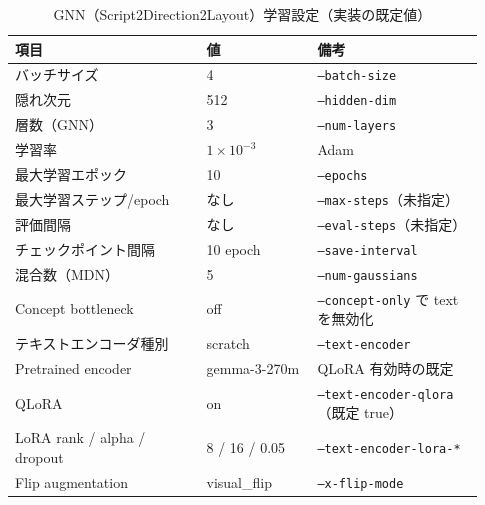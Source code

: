 \documentclass[a4j,12pt,dvipdfmx]{jsreport}
\begin{document}
\begin{table}[htbp]
  \centering
  \small
  \begin{threeparttable}
    \caption{GNN（Script2Direction2Layout）学習設定（実装の既定値）}
    \label{tab:gnn_hparams}
    \begin{tabular}{p{0.38\linewidth} p{0.22\linewidth} p{0.33\linewidth}}
      \toprule
      \textbf{項目}                 & \textbf{値}       & \textbf{備考}                            \\
      \midrule
      バッチサイズ                      & 4                & \texttt{--batch-size}                  \\
      隠れ次元                        & 512              & \texttt{--hidden-dim}                  \\
      層数（GNN）                     & 3                & \texttt{--num-layers}                  \\
      学習率                         & $1\times10^{-3}$ & Adam                                   \\
      最大学習エポック                    & 10               & \texttt{--epochs}                      \\
      最大学習ステップ/epoch              & なし               & \texttt{--max-steps}（未指定）              \\
      評価間隔                        & なし               & \texttt{--eval-steps}（未指定）             \\
      チェックポイント間隔                  & 10 epoch         & \texttt{--save-interval}               \\
      混合数（MDN）                    & 5                & \texttt{--num-gaussians}               \\
      Concept bottleneck          & off              & \texttt{--concept-only} で text を無効化    \\
      テキストエンコーダ種別                 & scratch          & \texttt{--text-encoder}                \\
      Pretrained encoder          & gemma-3-270m     & QLoRA 有効時の既定                           \\
      QLoRA                       & on               & \texttt{--text-encoder-qlora}（既定 true） \\
      LoRA rank / alpha / dropout & 8 / 16 / 0.05    & \texttt{--text-encoder-lora-*}         \\
      Flip augmentation           & visual\_flip     & \texttt{--x-flip-mode}                 \\

\end{tabular}
\end{threeparttable}
\end{table}
\end{document}
